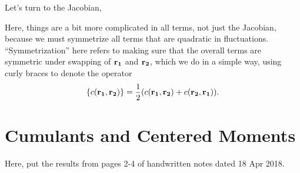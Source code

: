 \documentclass{paper}
\newcommand{\rr}[1]{\vb{r_{#1}}}
\begin{document}
Let's turn to the Jacobian, 


Here, things are a bit more complicated in all terms, not just the Jacobian, because we must symmetrize all terms that are quadratic in fluctuations. ``Symmetrization'' here refers to making sure that the overall terms are symmetric under swapping of $\rr1$ and $\rr2$, which we do in a simple way, using curly braces to denote the operator
\begin{equation}
  \label{eq:symmetrization}
  \qty{c(\rr1, \rr2)} = \frac{1}{2} \qty(c(\rr1, \rr2) + c(\rr2, \rr1)).
\end{equation}

\section{Cumulants and Centered Moments}
\label{sec:cumul-cent-moments}

Here, put the results from pages 2-4 of handwritten notes dated 18 Apr 2018.
\end{document}
